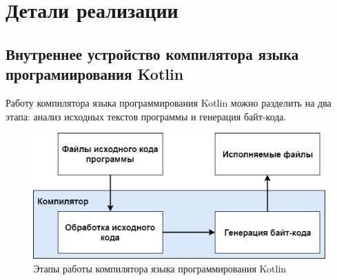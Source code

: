 \chapter{Детали реализации}



\section{Внутреннее устройство компилятора языка програмиирования Kotlin}

Работу компилятора языка программирования Kotlin можно разделить на два этапа: анализ исходных текстов программы и генерация байт-кода. 

\begin{figure}[htbp]
    \centering
    \includegraphics[width=\textwidth]{resources/06/01_compiler_scheme.png}
    \caption{Этапы работы компилятора языка программирования Kotlin}
    \label{fig05:compiler-scheme}
\end{figure}

